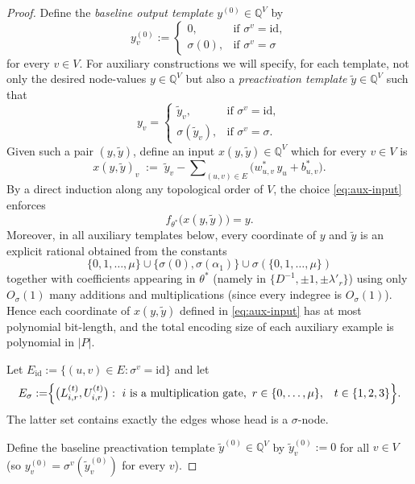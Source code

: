 \documentclass{article}
\newcommand{\Q}{\mathbb{Q}}
\theoremstyle{plain}
\theoremstyle{definition}
\theoremstyle{remark}
\begin{document}
\begin{proof}
\smallskip
Define the \emph{baseline output template} $y^{(0)}\in\Q^{V}$ by
\[
y^{(0)}_v :=
\begin{cases}
	0, & \text{if }\sigma^v=\mathrm{id},\\
	\sigma(0), & \text{if }\sigma^v=\sigma
\end{cases}
\]
for every $v \in V$. For auxiliary constructions we will specify, for each template, not only the desired node-values
$y\in\Q^{V}$ but also a \emph{preactivation template} $\tilde y\in\Q^{V}$ such that
\[
y_v=
\begin{cases}
	\tilde y_v, & \text{if }\sigma^v=\mathrm{id},\\
	\sigma(\tilde y_v), & \text{if }\sigma^v=\sigma.
\end{cases}
\]
Given such a pair $(y,\tilde y)$, define an input $x(y,\tilde y)\in\Q^{V}$ which for every $v\in V$ is
\begin{equation}
	\label{eq:aux-input}
	x(y,\tilde y)_v \;:=\; \tilde y_v - \sum\nolimits_{(u,v)\in E}\bigl(w^\ast_{u,v}\,y_u + b^\ast_{u,v}\bigr).
\end{equation}
By a direct induction along any topological order of $V$, the choice \eqref{eq:aux-input} enforces
\begin{equation}
	\label{eq:aux-realize}
	f_{\theta^\ast}\bigl(x(y,\tilde y)\bigr)=y.
\end{equation}
Moreover, in all auxiliary templates below, every coordinate of $y$ and $\tilde y$
is an explicit rational obtained from the constants
$$\{0,1,\dots,\mu\}\cup\{\sigma(0),\sigma(\alpha_1)\}\cup\sigma(\{0,1,\dots,\mu\})$$
together with coefficients appearing in $\theta^\ast$ (namely in $\{D^{-1},\pm 1,\pm \lambda'_r\}$)
using only $O_\sigma(1)$ many additions and multiplications (since every indegree is $O_\sigma(1)$).
Hence each coordinate of $x(y,\tilde y)$ defined in \eqref{eq:aux-input} has at most polynomial bit-length,
and the total encoding size of each auxiliary example is polynomial in $|P|$.

\smallskip
Let $E_{\mathrm{id}}:=\{(u,v)\in E:\sigma^v=\mathrm{id}\}$ and let
\[
\begin{aligned}
	E_{\sigma}
	:=& \Bigl\{\bigl(L^{(t)}_{i,r},U^{(t)}_{i,r}\bigr):\  i \text{ is a multiplication gate},\ r\in\{0,\dots,\mu\},
	& t\in\{1,2,3\}\Bigr\}.
\end{aligned}
\]
The latter set contains exactly the edges whose head is a $\sigma$-node.

\smallskip
Define the baseline preactivation template $\tilde y^{(0)}\in\Q^{V}$ by $\tilde y^{(0)}_v:=0$ for all $v\in V$
(so $y^{(0)}_v=\sigma^v\left(\tilde y^{(0)}_v\right)$ for every $v$).


\end{proof}
\end{document}
